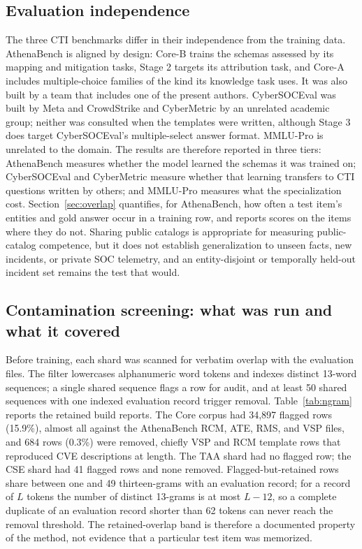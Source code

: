 \documentclass[twocolumn]{svjour3}
\begin{document}
\subsection{Evaluation independence}\label{sec:independence}
The three CTI benchmarks differ in their independence from the training data. AthenaBench is aligned by design: Core-B trains the schemas assessed by its mapping and mitigation tasks, Stage 2 targets its attribution task, and Core-A includes multiple-choice families of the kind its knowledge task uses. It was also built by a team that includes one of the present authors. CyberSOCEval was built by Meta and CrowdStrike and CyberMetric by an unrelated academic group; neither was consulted when the templates were written, although Stage 3 does target CyberSOCEval's multiple-select answer format. MMLU-Pro is unrelated to the domain. The results are therefore reported in three tiers: AthenaBench measures whether the model learned the schemas it was trained on; CyberSOCEval and CyberMetric measure whether that learning transfers to CTI questions written by others; and MMLU-Pro measures what the specialization cost. Section~\ref{sec:overlap} quantifies, for AthenaBench, how often a test item's entities and gold answer occur in a training row, and reports scores on the items where they do not. Sharing public catalogs is appropriate for measuring public-catalog competence, but it does not establish generalization to unseen facts, new incidents, or private SOC telemetry, and an entity-disjoint or temporally held-out incident set remains the test that would.

\subsection{Contamination screening: what was run and what it covered}\label{sec:contamination}
Before training, each shard was scanned for verbatim overlap with the evaluation files. The filter lowercases alphanumeric word tokens and indexes distinct 13-word sequences; a single shared sequence flags a row for audit, and at least 50 shared sequences with one indexed evaluation record trigger removal. Table~\ref{tab:ngram} reports the retained build reports. The Core corpus had 34,897 flagged rows (15.9\%), almost all against the AthenaBench RCM, ATE, RMS, and VSP files, and 684 rows (0.3\%) were removed, chiefly VSP and RCM template rows that reproduced CVE descriptions at length. The TAA shard had no flagged row; the CSE shard had 41 flagged rows and none removed. Flagged-but-retained rows share between one and 49 thirteen-grams with an evaluation record; for a record of $L$ tokens the number of distinct 13-grams is at most $L-12$, so a complete duplicate of an evaluation record shorter than 62 tokens can never reach the removal threshold. The retained-overlap band is therefore a documented property of the method, not evidence that a particular test item was memorized.
\end{document}
